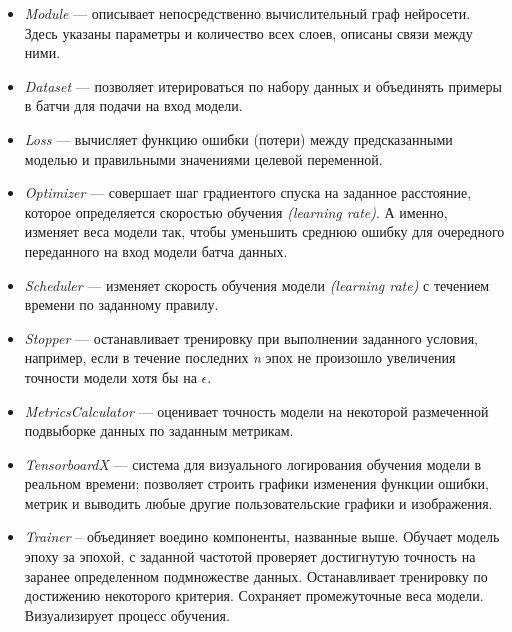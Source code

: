 \begin{itemize}

	\item
	\textit{Module} --- описывает непосредственно вычислительный граф нейросети. 
	Здесь указаны параметры и количество всех слоев, описаны связи между ними.
	
	\item
	\textit{Dataset} --- позволяет итерироваться по набору данных и объединять 
	примеры в батчи для подачи на вход модели.
	
	\item
	\textit{Loss} --- вычисляет функцию ошибки (потери) между предсказанными 
	моделью  и правильными значениями целевой переменной.
	
	\item
	\textit{Optimizer} --- совершает шаг градиентого спуска на заданное расстояние,
	которое определяется скоростью обучения \textit{(learning rate)}. А именно,
	изменяет веса модели так, чтобы уменьшить среднюю ошибку для очередного
	переданного на вход модели батча данных.
	
	\item
	\textit{Scheduler} --- изменяет скорость обучения модели \textit{(learning rate)}
	с течением времени по заданному правилу.
	
	\item
	\textit{Stopper} --- останавливает тренировку при выполнении заданного 
	условия, например, если в течение последних \textit{n} эпох не произошло
	увеличения точности модели хотя бы на $\epsilon$.
	
	\item
	\textit{MetricsCalculator} --- оценивает точность модели на некоторой размеченной
	подвыборке данных по заданным метрикам.
	
	\item
	\textit{TensorboardX}  --- система для визуального логирования обучения
	модели в реальном времени;
	позволяет строить графики изменения функции ошибки, метрик и
	выводить любые другие пользовательские графики и изображения.
	
	\item
	\textit{Trainer} -- объединяет воедино компоненты, названные выше. Обучает
	модель эпоху за эпохой, с заданной частотой проверяет достигнутую точность
	на заранее определенном подмножестве данных. Останавливает тренировку по
	достижению некоторого критерия. Сохраняет промежуточные
	веса модели. Визуализирует процесс обучения.
 
 \end{itemize}



